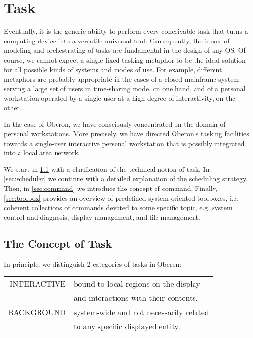 \chapter{Task}
\label{ch:task}
Eventually, it is the generic ability to perform every conceivable task
that turns a computing device into a versatile universal tool. Consequently,
the issues of modeling and orchestrating of tasks are fundamental in the design of any OS.
Of course, we cannot expect a single fixed tasking metaphor to be the ideal solution
for all possible kinds of systems and modes of use. For example, different metaphors are
probably appropriate in the cases of a closed mainframe system serving a large set of users
in time-sharing mode, on one hand, and of a personal workstation operated by a single user
at a high degree of interactivity, on the other.

In the case of Oberon, we have consciously concentrated on the domain of personal workstations.
More precisely, we have directed Oberon's tasking facilities towards a single-user interactive
personal workstation that is possibly integrated into a local area network.

We start in \ref{sec:task} with a clarification of the technical notion of task.
In \ref{sec:scheduler} we continue with a detailed explanation of the scheduling strategy.
Then, in \ref{sec:command} we introduce the concept of command.
Finally, \ref{sec:toolbox} provides an overview of predefined system-oriented toolboxes,
i.e. coherent collections of commands devoted to some specific topic,
e.g. system control and diagnosis, display management, and file management.

\section{The Concept of Task}
\label{sec:task}
In principle, we distinguish 2 categories of tasks in Oberon:
\begin{table}[h!]
  \centering
  \begin{tabular}{r l}
    \small{INTERACTIVE}& bound to local regions on the display \\
                       & and interactions with their contents, \\
    \small{BACKGROUND} & system-wide and not necessarily related\\
                       & to any specific displayed entity.
  \end{tabular}
\end{table}

